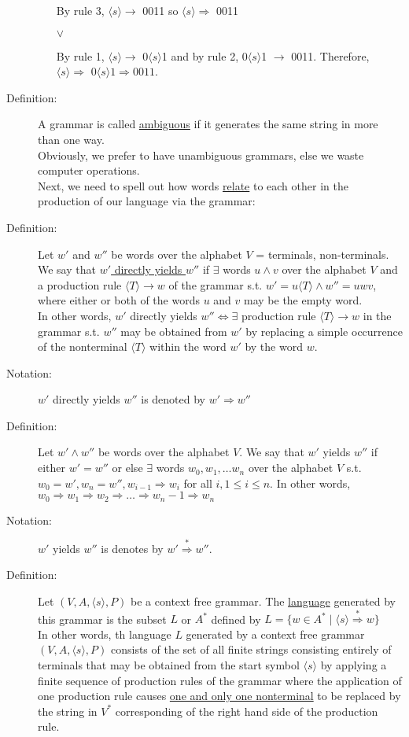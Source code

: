 \documentclass[10pt]{article}
\begin{document}
\begin{description}
		\begin{enumerate}
			\item[By rule 3,] $\langle s\rangle \rightarrow$ 0011 so $\langle s\rangle \Rightarrow$ 0011
			\item[] $\lor$
			\item[By rule 1,] $\langle s\rangle \rightarrow$ 0$\langle s\rangle $1 and by rule 2, 0$\langle s\rangle $1 $\rightarrow$ 0011. Therefore, $\langle s\rangle \Rightarrow$ 0$\langle s\rangle 1 \Rightarrow 0011$.
		\end{enumerate}
		\item[Definition:] A grammar is called \underline{ambiguous} if it generates the same string in more than one way. \\
		Obviously, we prefer to have unambiguous grammars, else we waste computer operations. \\
		Next, we need to spell out how words \underline{relate} to each other in the production of our language via the grammar:
		\item[Definition:] Let $w'$ and $w''$ be words over the alphabet $V$ = {terminals, non-terminals}. We say that \underline{$w'$ directly yields $w''$} if $\exists$ words $u \land v$ over the alphabet $V$ and a production rule $\langle T\rangle \rightarrow w$ of the grammar s.t. $w' = u\langle T\rangle \land w'' = uwv$, where either or both of the words $u$ and $v$ may be the empty word. \\
		In other words, $w'$ directly yields $w'' \Leftrightarrow \exists$ production rule $\langle T\rangle \rightarrow w$ in the grammar s.t. $w''$ may be obtained from $w'$ by replacing a simple occurrence of the nonterminal $\langle T\rangle $ within the word $w'$ by the word $w$.
		\item[Notation:] $w'$ directly yields $w''$ is denoted by $w' \Rightarrow w''$
		\item[Definition:] Let $w' \land w''$ be words over the alphabet $V$. We say that $w'$ yields $w''$ if either $w'= w''$ or else $\exists$ words $w_0, w_1, \dots w_n$ over the alphabet $V$ s.t. $w_0=w', w_n = w'', w_{i-1} \Rightarrow w_i$ for all $i, 1 \leq i \leq n$. In other words, $w_0 \Rightarrow w_1 \Rightarrow w_2 \Rightarrow \dots \Rightarrow w_n-1 \Rightarrow w_n$
		\item[Notation:] $w'$ yields $w''$ is denotes by $w' \overset{*}{\Rightarrow} w''$.
		\item[Definition:] Let $(V, A, \langle s\rangle , P)$ be a context free grammar. The \underline{language} generated by this grammar is the subset $L$ or $A^*$ defined by $L = \{w \in A^* \mid \langle s\rangle \overset{*}{\Rightarrow} w\}$ \\
		In other words, th language $L$ generated by a context free grammar $(V, A, \langle s\rangle , P)$ consists of the set of all finite strings consisting entirely of terminals that may be obtained from the start symbol $\langle s\rangle $ by applying a finite sequence of production rules of the grammar where the application of one production rule causes \underline{one and only one nonterminal} to be replaced by the string in $V^*$ corresponding of the right hand side of the production rule.
	\end{description}
	
\end{document}
